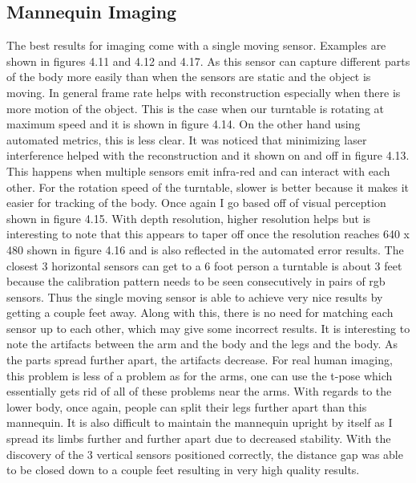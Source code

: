 \subsection{Mannequin Imaging}
The best results for imaging come with a single moving sensor. Examples are shown in figures 4.11 and 4.12 and 4.17. As this sensor can capture different parts of the body more easily than when the sensors are static and the object is moving. In general frame rate helps with reconstruction especially when there is more motion of the object. This is the case when our turntable is rotating at maximum speed and it is shown in figure 4.14. On the other hand using automated metrics, this is less clear. It was noticed that minimizing laser interference helped with the reconstruction and it shown on and off in figure 4.13. This happens when multiple sensors emit infra-red and can interact with each other. For the rotation speed of the turntable, slower is better because it makes it easier for tracking of the body. Once again I go based off of visual perception shown in figure 4.15. With depth resolution, higher resolution helps but is interesting to note that this appears to taper off once the resolution reaches 640 x 480 shown in figure 4.16 and is also reflected in the automated error results. The closest 3 horizontal sensors can get to a 6 foot person a turntable is about 3 feet because the calibration pattern needs to be seen consecutively in pairs of rgb sensors. Thus the single moving sensor is able to achieve very nice results by getting a couple feet away. Along with this, there is no need for matching each sensor up to each other, which may give some incorrect results. It is interesting to note the artifacts between the arm and the body and the legs and the body. As the parts spread further apart, the artifacts decrease. For real human imaging, this problem is less of a problem as for the arms, one can use the t-pose which essentially gets rid of all of these problems near the arms. With regards to the lower body, once again, people can split their legs further apart than this mannequin. It is also difficult to maintain the mannequin upright by itself as I spread its limbs further and further apart due to decreased stability. With the discovery of the 3 vertical sensors positioned correctly, the distance gap was able to be closed down to a couple feet resulting in very high quality results.

